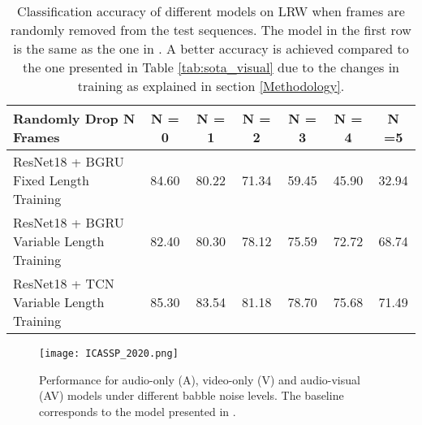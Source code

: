 \documentclass{article}
\begin{document}
\begin{table*}[htb]
\begin{center}
\begin{tabular}{|l|c|c|c|c|c|c|}
\hline
Randomly Drop N Frames  & N = 0 & N = 1 & N = 2 & N = 3 & N = 4 & N =5 \\
\hline
ResNet18 + BGRU Fixed Length Training & 84.60 & 80.22  & 71.34 & 59.45 & 45.90 & 32.94 \\
ResNet18 + BGRU Variable Length Training & 82.40 & 80.30 & 78.12 & 75.59 & 72.72 & 68.74 \\
ResNet18 + TCN Variable Length Training & 85.30 & 83.54 & 81.18 & 78.70 & 75.68 & 71.49 \\
\hline
\end{tabular}
\vspace{-2mm}
\end{center}
\caption{Classification accuracy of different models on LRW when frames are randomly removed from the test sequences. The model in the first row is the same as the one in \cite{petridis18}. A better accuracy is achieved compared to the one presented in Table \ref{tab:sota_visual} due to the changes in training as explained in section \ref{Methodology}.   }
\label{tab:frame_removal}
\end{table*}

\begin{figure}[ht]
    \begin{center}
    \texttt{[image: ICASSP\_2020.png]}
    \end{center}
    \caption{Performance for audio-only (A), video-only (V) and audio-visual (AV) models under different babble noise levels. The baseline corresponds to the model presented in \cite{petridis18}. }
    \label{fig:av_results}
\end{figure}
\end{document}
